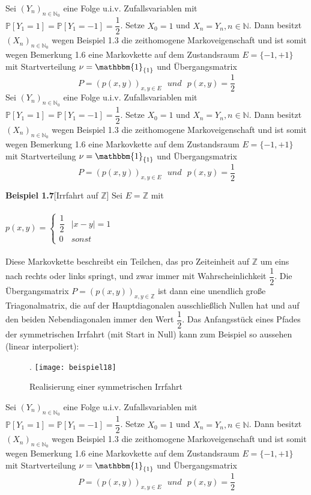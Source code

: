 Sei $(Y_{n})_{n \in \mathbb{N}_{0}}$ eine Folge u.i.v. Zufallsvariablen mit 
\\
$\mathbb{P}[Y_{1} = 1] = \mathbb{P}[Y_{1} = -1] =\dfrac{1}{2}$. Setze $X_{0} = 1$ und $X_{n} = Y_{n}, n \in \mathbb{N}$. Dann besitzt $(X_{n})_{n \in \mathbb{N}_{0}}$ wegen Beispiel 1.3 die zeithomogene Markoveigenschaft und ist somit wegen Bemerkung 1.6 eine Markovkette auf dem Zustandsraum $E = \lbrace -1,+1  \rbrace$ mit Startverteilung $\nu = \mathbbm{1}_{\lbrace 1 \rbrace}$ und Übergangsmatrix 
\begin{equation*}
P =(p(x,y))_{x,y \in E} \: \: \:  und \: \: \: p(x,y) = \dfrac{1}{2}
\end{equation*}Sei $(Y_{n})_{n \in \mathbb{N}_{0}}$ eine Folge u.i.v. Zufallsvariablen mit 
\\
$\mathbb{P}[Y_{1} = 1] = \mathbb{P}[Y_{1} = -1] =\dfrac{1}{2}$. Setze $X_{0} = 1$ und $X_{n} = Y_{n}, n \in \mathbb{N}$. Dann besitzt $(X_{n})_{n \in \mathbb{N}_{0}}$ wegen Beispiel 1.3 die zeithomogene Markoveigenschaft und ist somit wegen Bemerkung 1.6 eine Markovkette auf dem Zustandsraum $E = \lbrace -1,+1  \rbrace$ mit Startverteilung $\nu = \mathbbm{1}_{\lbrace 1 \rbrace}$ und Übergangsmatrix 
\begin{equation*}
P =(p(x,y))_{x,y \in E} \: \: \:  und \: \: \: p(x,y) = \dfrac{1}{2}
\end{equation*}

\textbf{Beispiel 1.7}[Irrfahrt auf $\mathbb{Z}$]
Sei $E = \mathbb{Z}$ mit
\\
\\
$p(x,y)=
\begin{cases}
\dfrac{1}{2} &  |x - y| = 1\\
0 & sonst
\end{cases}$
\\
\\
Diese Markovkette beschreibt ein Teilchen, das pro Zeiteinheit auf $\mathbb{Z}$ um eins nach rechts oder
links springt, und zwar immer mit Wahrscheinlichkeit $\dfrac{1}{2}$. Die Übergangsmatrix $P = (p(x,y))_{x,y \in \mathbb{Z}}$
ist dann eine unendlich große Triagonalmatrix, die auf der Hauptdiagonalen ausschließlich Nullen hat und auf den beiden Nebendiagonalen immer den Wert $\dfrac{1}{2}$.
Das Anfangsstück eines Pfades der symmetrischen Irrfahrt (mit Start in Null) kann zum Beispiel so aussehen (linear interpoliert):
\begin{figure}[H].
\centering
\texttt{[image: beispiel18]}
\caption{Realisierung einer symmetrischen Irrfahrt}
\end{figure}Sei $(Y_{n})_{n \in \mathbb{N}_{0}}$ eine Folge u.i.v. Zufallsvariablen mit 
\\
$\mathbb{P}[Y_{1} = 1] = \mathbb{P}[Y_{1} = -1] =\dfrac{1}{2}$. Setze $X_{0} = 1$ und $X_{n} = Y_{n}, n \in \mathbb{N}$. Dann besitzt $(X_{n})_{n \in \mathbb{N}_{0}}$ wegen Beispiel 1.3 die zeithomogene Markoveigenschaft und ist somit wegen Bemerkung 1.6 eine Markovkette auf dem Zustandsraum $E = \lbrace -1,+1  \rbrace$ mit Startverteilung $\nu = \mathbbm{1}_{\lbrace 1 \rbrace}$ und Übergangsmatrix 
\begin{equation*}
P =(p(x,y))_{x,y \in E} \: \: \:  und \: \: \: p(x,y) = \dfrac{1}{2}
\end{equation*}

